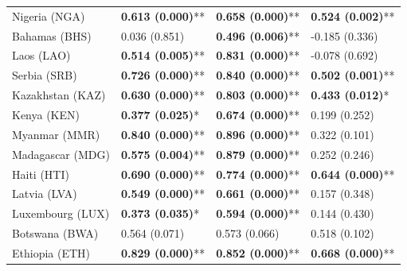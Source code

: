 \begin{longtable}{p{5cm}p{3cm}p{3cm}p{5cm}}
Nigeria (NGA) & \textcolor{atlLime600}{\textbf{0.613 (0.000)}**} & \textcolor{atlLime600}{\textbf{0.658 (0.000)}**} & \textcolor{atlLime600}{\textbf{0.524 (0.002)}**} \\
Bahamas (BHS) & \textcolor{atlOrange600}{0.036 (0.851)} & \textcolor{atlLime600}{\textbf{0.496 (0.006)}**} & \textcolor{atlOrange600}{-0.185 (0.336)} \\
Laos (LAO) & \textcolor{atlLime600}{\textbf{0.514 (0.005)}**} & \textcolor{atlLime600}{\textbf{0.831 (0.000)}**} & \textcolor{atlOrange600}{-0.078 (0.692)} \\
Serbia (SRB) & \textcolor{atlLime600}{\textbf{0.726 (0.000)}**} & \textcolor{atlLime600}{\textbf{0.840 (0.000)}**} & \textcolor{atlLime600}{\textbf{0.502 (0.001)}**} \\
Kazakhstan (KAZ) & \textcolor{atlLime600}{\textbf{0.630 (0.000)}**} & \textcolor{atlLime600}{\textbf{0.803 (0.000)}**} & \textcolor{atlLime600}{\textbf{0.433 (0.012)}*} \\
Kenya (KEN) & \textcolor{atlLime600}{\textbf{0.377 (0.025)}*} & \textcolor{atlLime600}{\textbf{0.674 (0.000)}**} & \textcolor{atlOrange600}{0.199 (0.252)} \\
Myanmar (MMR) & \textcolor{atlLime600}{\textbf{0.840 (0.000)}**} & \textcolor{atlLime600}{\textbf{0.896 (0.000)}**} & \textcolor{atlOrange600}{0.322 (0.101)} \\
Madagascar (MDG) & \textcolor{atlLime600}{\textbf{0.575 (0.004)}**} & \textcolor{atlLime600}{\textbf{0.879 (0.000)}**} & \textcolor{atlOrange600}{0.252 (0.246)} \\
Haiti (HTI) & \textcolor{atlLime600}{\textbf{0.690 (0.000)}**} & \textcolor{atlLime600}{\textbf{0.774 (0.000)}**} & \textcolor{atlLime600}{\textbf{0.644 (0.000)}**} \\
Latvia (LVA) & \textcolor{atlLime600}{\textbf{0.549 (0.000)}**} & \textcolor{atlLime600}{\textbf{0.661 (0.000)}**} & \textcolor{atlOrange600}{0.157 (0.348)} \\
Luxembourg (LUX) & \textcolor{atlLime600}{\textbf{0.373 (0.035)}*} & \textcolor{atlLime600}{\textbf{0.594 (0.000)}**} & \textcolor{atlOrange600}{0.144 (0.430)} \\
Botswana (BWA) & \textcolor{atlOrange600}{0.564 (0.071)} & \textcolor{atlOrange600}{0.573 (0.066)} & \textcolor{atlOrange600}{0.518 (0.102)} \\
Ethiopia (ETH) & \textcolor{atlLime600}{\textbf{0.829 (0.000)}**} & \textcolor{atlLime600}{\textbf{0.852 (0.000)}**} & \textcolor{atlLime600}{\textbf{0.668 (0.000)}**} \\

\end{longtable}
